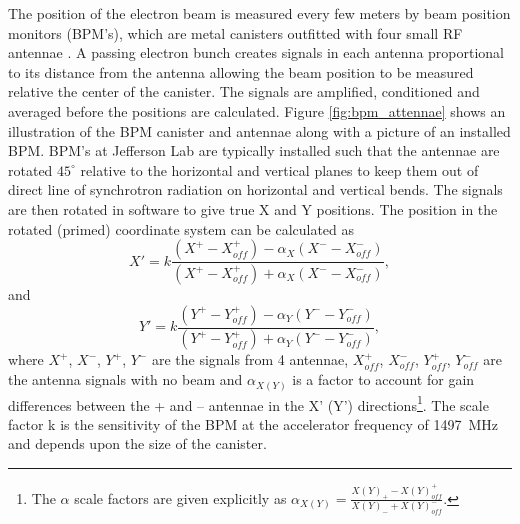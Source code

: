 The position of the electron beam is measured every few meters by beam position monitors (BPM's), which are metal canisters outfitted with four small RF antennae \cite{Barry1991}\cite{Powers1997}. A passing electron bunch creates signals in each antenna proportional to its distance from the antenna allowing the beam position to be measured relative the center of the canister. The signals are amplified, conditioned and averaged before the positions are calculated. Figure \ref{fig:bpm_attennae} shows an illustration of the BPM canister and antennae along with a picture of an installed BPM. BPM's at Jefferson Lab are typically installed such that the antennae are rotated $45^{\circ}$ relative to the horizontal and vertical planes to keep them out of direct line of synchrotron radiation on horizontal and vertical bends. The signals are then rotated in software to give true X and Y positions. The position in the rotated (primed) coordinate system can be calculated as \cite{Geoffrey1993}
\begin{equation}
X'=k\frac{(X^+-X_{off}^+)-\alpha_X(X^--X_{off}^-)}{(X^+-X_{off}^+)+\alpha_X(X^--X_{off}^-)},
\label{eq:x_prime}
\end{equation}
and
\begin{equation}
Y'=k\frac{(Y^+-Y_{off}^+)-\alpha_Y(Y^--Y_{off}^-)}{(Y^+-Y_{off}^+)+\alpha_Y(Y^--Y_{off}^-)},
\label{eq:y_prime}
\end{equation}
where $X^+$, $X^-$, $Y^+$, $Y^-$ are the signals from 4 antennae, $X_{off}^+$, $X_{off}^-$, $Y_{off}^+$, $Y_{off}^-$ are the antenna signals with no beam and $\alpha_{X(Y)}$ is a factor to account for gain differences between the + and -- antennae in the X' (Y') directions\footnote{The $\alpha$ scale factors are given explicitly as $\alpha_{X(Y)}=\frac{X(Y)_+-X(Y)_{off}^+}{X(Y)_-+X(Y)_{off}^-}$.}. The scale factor k is the sensitivity of the BPM at the accelerator frequency of 1497~MHz and depends upon the size of the canister.

